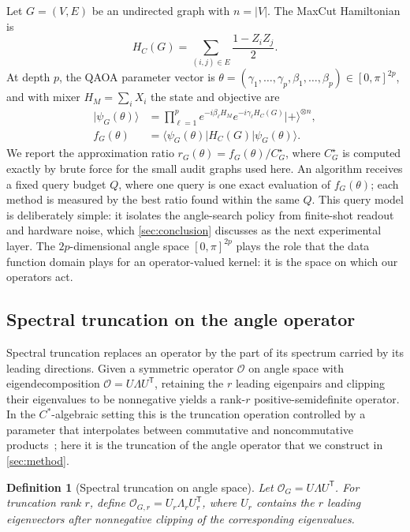 \documentclass[aps,prxquantum,reprint,amsmath,amssymb,floatfix,nofootinbib,superscriptaddress,longbibliography]{revtex4-2}
\newtheorem{definition}{Definition}
\theoremstyle{remark}
\newcommand{\calO}{\mathcal{O}}
\begin{document}
Let \(G=(V,E)\) be an undirected graph with \(n=|V|\).  The MaxCut Hamiltonian is
\begin{equation}
    H_C(G)=\sum_{(i,j)\in E}\frac{1-Z_iZ_j}{2}.
\end{equation}
At depth \(p\), the QAOA parameter vector is
\(\theta=(\gamma_1,\ldots,\gamma_p,\beta_1,\ldots,\beta_p)\in[0,\pi]^{2p}\),
and with mixer \(H_M=\sum_i X_i\) the state and objective are
\begin{align}
    |\psi_G(\theta)\rangle &=
    \prod_{\ell=1}^{p}e^{-i\beta_\ell H_M}e^{-i\gamma_\ell H_C(G)}
    |+\rangle^{\otimes n}, \\
    f_G(\theta)&=\langle\psi_G(\theta)|H_C(G)|\psi_G(\theta)\rangle .
\end{align}
We report the approximation ratio \(r_G(\theta)=f_G(\theta)/C_G^\star\), where
\(C_G^\star\) is computed exactly by brute force for the small audit graphs used
here.  An algorithm receives a fixed query budget \(Q\), where one query is one
exact evaluation of \(f_G(\theta)\); each method is measured by the best ratio
found within the same \(Q\).  This query model is deliberately simple: it
isolates the angle-search policy from finite-shot readout and hardware noise,
which \cref{sec:conclusion} discusses as the next experimental layer.  The
\(2p\)-dimensional angle space \([0,\pi]^{2p}\) plays the role that the data
function domain plays for an operator-valued kernel: it is the space on which our
operators act.

\subsection{Spectral truncation on the angle operator}
\label{sec:trunc}

Spectral truncation replaces an operator by the part of its spectrum carried by
its leading directions.  Given a symmetric operator \(\calO\) on angle space with
eigendecomposition \(\calO=U\Lambda U^{\mathsf T}\), retaining the \(r\) leading
eigenpairs and clipping their eigenvalues to be nonnegative yields a rank-\(r\)
positive-semidefinite operator.  In the \(C^*\)-algebraic setting this is the
truncation operation controlled by a parameter that interpolates between
commutative and noncommutative products~\cite{hashimoto2024spectral}; here it is
the truncation of the angle operator that we construct in \cref{sec:method}.

\begin{definition}[Spectral truncation on angle space]
\label{def:trunc}
Let \(\calO_G=U\Lambda U^{\mathsf T}\).  For truncation rank \(r\), define
\(\calO_{G,r}=U_r\Lambda_rU_r^{\mathsf T}\), where \(U_r\) contains the \(r\)
leading eigenvectors after nonnegative clipping of the corresponding eigenvalues.
\end{definition}
\end{document}
